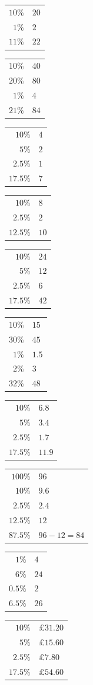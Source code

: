\documentclass{beamer}
\makeatletter
\newcommand{\steps}[1]{%
  \begin{tabular}{@{}r@{\ is\ }l@{}}#1\end{tabular}%
}
\makeatother
\begin{document}
  {\steps{$10\%$ & $20$ \\ $1\%$ & $2$ \\ $11\%$ & $22$}}
  {\steps{$10\%$ & $40$ \\ $20\%$ & $80$ \\ $1\%$ & $4$ \\ $21\%$ & $84$}}
  {\steps{$10\%$ & $4$ \\ $5\%$ & $2$ \\ $2.5\%$ & $1$ \\ $17.5\%$ & $7$}}
  {\steps{$10\%$ & $8$ \\ $2.5\%$ & $2$ \\ $12.5\%$ & $10$}}
  {\steps{$10\%$ & $24$ \\ $5\%$ & $12$ \\ $2.5\%$ & $6$ \\ $17.5\%$ & $42$}}
  {\steps{$10\%$ & $15$ \\ $30\%$ & $45$ \\ $1\%$ & $1.5$ \\ $2\%$ & $3$ \\ $32\%$ & $48$}}
  {\steps{$10\%$ & $6.8$ \\ $5\%$ & $3.4$ \\ $2.5\%$ & $1.7$ \\ $17.5\%$ & $11.9$}}
  {\steps{$100\%$ & $96$ \\ $10\%$ & $9.6$ \\ $2.5\%$ & $2.4$ \\ $12.5\%$ & $12$ \\ $87.5\%$ & $96-12=84$}}
  {\steps{$1\%$ & $4$ \\ $6\%$ & $24$ \\ $0.5\%$ & $2$ \\ $6.5\%$ & $26$}}
  {\steps{$10\%$ & \pounds $31.20$ \\ $5\%$ & \pounds $15.60$ \\
          $2.5\%$ & \pounds $7.80$ \\ $17.5\%$ & \pounds $54.60$}}
\end{document}
